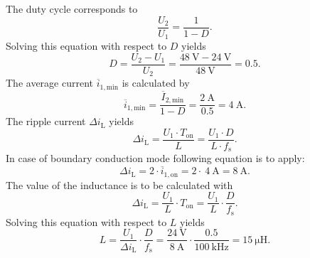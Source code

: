 \begin{solutionblock}
    The duty cycle corresponds to
    \begin{equation*}
        \frac{U_\mathrm{2}}{U_\mathrm{1}}=\frac{1}{1-D}.
        \label{eq:voltage_ratio}
    \end{equation*}
    Solving this equation with respect to $D$ yields
    \begin{equation*}
        D=\frac{U_\mathrm{2}-U_\mathrm{1}}{U_\mathrm{2}}=\frac{\SI{48}{\volt}-\SI{24}{\volt}}{\SI{48}{\volt}}=0.5.
        \label{eq:dutycycle}
    \end{equation*}
    The average current $\overline{i}_\mathrm{1,min}$ is calculated by
    \begin{equation*}
       \overline{i}_\mathrm{1,min} = \frac {\overline{I}_\mathrm{2,min}}{1-D}= \frac{\SI{2}{\ampere}}{0.5}=\SI{4}{\ampere}.
    \end{equation*}
    The ripple current $\Delta i_\mathrm{L}$ yields
    \begin{equation*}
        \Delta i_\mathrm{L}=\frac{U_\mathrm{1} \cdot T_\mathrm{on}}{L} =\frac{U_\mathrm{1} \cdot D}{L \cdot f_\mathrm{s}}.
        \label{eq:u_on}
    \end{equation*}
    In case of boundary conduction mode following equation is to apply:
    \begin{equation*}
        \Delta i_\mathrm{L}= 2 \cdot \overline{i}_\mathrm{1,on}= 2 \cdot\ \SI{4}{\ampere} = \SI{8}{\ampere}.
    \end{equation*}
    The value of the inductance is to be calculated with
    \begin{equation*}
        \Delta i_\mathrm{L}= \frac{U_\mathrm{1}}{L} \cdot T_\mathrm{on} = \frac{U_\mathrm{1}}{L} \cdot \frac{D}{f_\mathrm{s}}. 
    \end{equation*}
    Solving this equation with respect to $L$ yields
    \begin{equation*}
        L= \frac{U_\mathrm{1}}{\Delta i_\mathrm{L}} \cdot \frac{D}{f_\mathrm{s}} = \frac{\SI{24}{\volt}}{\SI{8}{\ampere}} \cdot \frac{0.5}{\SI{100}{\kilo\hertz}} = \SI{15}{\micro\henry}.
    \end{equation*}
\end{solutionblock}


%

